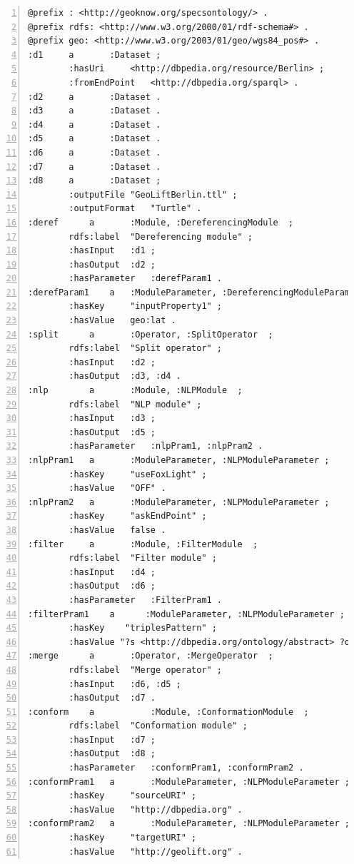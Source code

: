 \documentclass[a4paper,twoside,bibtotoc,abstracton,12pt,BCOR=15mm]{article}
\begin{document}
\begin{lstlisting}[label=lst:rdfconf, float=tp, basicstyle=\scriptsize, numbers=left, numberstyle=\tiny, caption = Example of RDF configuration file.]
@prefix : <http://geoknow.org/specsontology/> .
@prefix rdfs: <http://www.w3.org/2000/01/rdf-schema#> .
@prefix geo: <http://www.w3.org/2003/01/geo/wgs84_pos#> .
:d1		a		:Dataset ;
		:hasUri		<http://dbpedia.org/resource/Berlin> ;
		:fromEndPoint	<http://dbpedia.org/sparql> .
:d2		a		:Dataset .
:d3		a		:Dataset .
:d4		a		:Dataset .
:d5		a		:Dataset .
:d6		a		:Dataset .
:d7		a		:Dataset .
:d8		a		:Dataset ;
		:outputFile	"GeoLiftBerlin.ttl" ;
		:outputFormat	"Turtle" .
:deref		a		:Module, :DereferencingModule  ;
		rdfs:label	"Dereferencing module" ;
		:hasInput	:d1 ;
		:hasOutput	:d2 ;
		:hasParameter	:derefParam1 .
:derefParam1	a   :ModuleParameter, :DereferencingModuleParameter ;
		:hasKey		"inputProperty1" ;
		:hasValue	geo:lat .
:split		a		:Operator, :SplitOperator  ;
		rdfs:label	"Split operator" ;
		:hasInput	:d2 ;
		:hasOutput	:d3, :d4 .
:nlp		a		:Module, :NLPModule  ;
		rdfs:label	"NLP module" ;
		:hasInput	:d3 ;
		:hasOutput	:d5 ;
		:hasParameter	:nlpPram1, :nlpPram2 .
:nlpPram1	a		:ModuleParameter, :NLPModuleParameter ;
		:hasKey		"useFoxLight" ;
		:hasValue	"OFF" .
:nlpPram2 	a		:ModuleParameter, :NLPModuleParameter ;
		:hasKey		"askEndPoint" ;
		:hasValue	false .
:filter		a		:Module, :FilterModule  ;
		rdfs:label	"Filter module" ;
		:hasInput	:d4 ;
		:hasOutput	:d6 ;
		:hasParameter	:FilterPram1 .
:filterPram1	a      :ModuleParameter, :NLPModuleParameter ;
	    :hasKey    "triplesPattern" ;
	    :hasValue "?s <http://dbpedia.org/ontology/abstract> ?o".
:merge		a		:Operator, :MergeOperator  ;
		rdfs:label	"Merge operator" ;
		:hasInput	:d6, :d5 ;
		:hasOutput	:d7 .
:conform	a			:Module, :ConformationModule  ;
		rdfs:label	"Conformation module" ;
		:hasInput	:d7 ;
		:hasOutput	:d8 ;
		:hasParameter	:conformPram1, :conformPram2 .
:conformPram1	a		:ModuleParameter, :NLPModuleParameter ;
		:hasKey		"sourceURI" ;
		:hasValue	"http://dbpedia.org" .
:conformPram2	a		:ModuleParameter, :NLPModuleParameter ;
		:hasKey		"targetURI" ;
		:hasValue	"http://geolift.org" .
\end{lstlisting}
\end{document}
